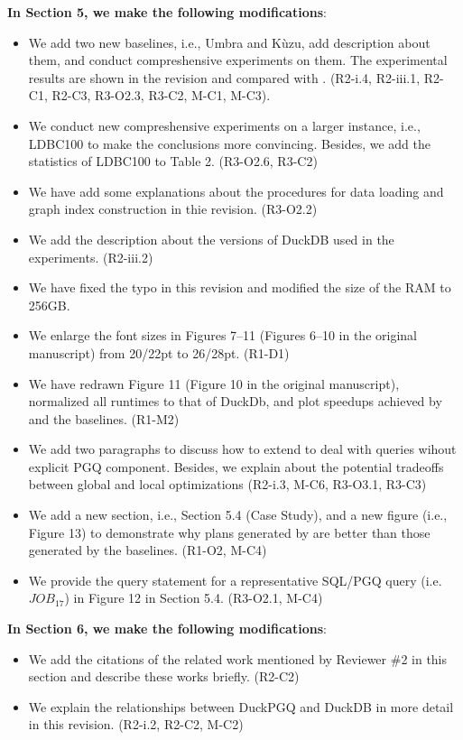 \textbf{In Section 5, we make the following modifications}:
\begin{itemize}
	\item We add two new baselines, i.e., Umbra and K\`uzu, add description about them, and conduct compreshensive experiments on them. The experimental results are shown in the revision and compared with \name. (R2-i.4, R2-iii.1, R2-C1, R2-C3, R3-O2.3, R3-C2, M-C1, M-C3). 
	\item We conduct new compreshensive experiments on a larger instance, i.e., LDBC100 to make the conclusions more convincing. Besides, we add the statistics of LDBC100 to Table 2. (R3-O2.6, R3-C2)
	\item We have add some explanations about the procedures for data loading and graph index construction in thie revision. (R3-O2.2)
	\item We add the description about the versions of DuckDB used in the experiments. (R2-iii.2)
	\item We have fixed the typo in this revision and modified the size of the RAM to 256GB.
	\item We enlarge the font sizes in Figures 7--11 (Figures 6--10 in the original manuscript) from 20/22pt to 26/28pt. (R1-D1)
	\item We have redrawn Figure 11 (Figure 10 in the original manuscript), normalized all runtimes to that of DuckDb, and plot speedups achieved by \name and the baselines. (R1-M2)
	\item We add two paragraphs to discuss how to extend \name to deal with queries wihout explicit PGQ component. Besides, we explain about the potential tradeoffs between global and local optimizations (R2-i.3, M-C6, R3-O3.1, R3-C3)
	\item We add a new section, i.e., Section 5.4 (Case Study), and a new figure (i.e., Figure 13) to demonstrate why plans generated by \name are better than those generated by the baselines. (R1-O2, M-C4)
	\item We provide the query statement for a representative SQL/PGQ query (i.e. $JOB_{17}$) in Figure 12 in Section 5.4. (R3-O2.1, M-C4)
\end{itemize}

\textbf{In Section 6, we make the following modifications}:
\begin{itemize}
	\item We add the citations of the related work mentioned by Reviewer \#2 in this section and describe these works briefly. (R2-C2)
	\item We explain the relationships between DuckPGQ and DuckDB in more detail in this revision. (R2-i.2, R2-C2, M-C2)
\end{itemize}

